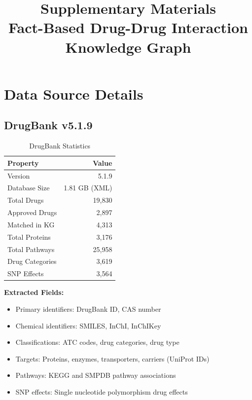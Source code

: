 \documentclass[11pt,a4paper]{article}
\title{\textbf{Supplementary Materials}\\
\large Fact-Based Drug-Drug Interaction Knowledge Graph}
\author{}
\date{}
\begin{document}
\maketitle

\tableofcontents
\newpage

\section{Data Source Details}

\subsection{DrugBank v5.1.9}
\label{sec:drugbank}

\begin{table}[h]
\centering
\caption{DrugBank Statistics}
\begin{tabular}{@{}lr@{}}
\toprule
\textbf{Property} & \textbf{Value} \\
\midrule
Version & 5.1.9 \\
Database Size & 1.81 GB (XML) \\
Total Drugs & 19,830 \\
Approved Drugs & 2,897 \\
Matched in KG & 4,313 \\
Total Proteins & 3,176 \\
Total Pathways & 25,958 \\
Drug Categories & 3,619 \\
SNP Effects & 3,564 \\
\bottomrule
\end{tabular}
\end{table}

\textbf{Extracted Fields:}
\begin{itemize}
    \item Primary identifiers: DrugBank ID, CAS number
    \item Chemical identifiers: SMILES, InChI, InChIKey
    \item Classifications: ATC codes, drug categories, drug type
    \item Targets: Proteins, enzymes, transporters, carriers (UniProt IDs)
    \item Pathways: KEGG and SMPDB pathway associations
    \item SNP effects: Single nucleotide polymorphism drug effects
\end{itemize}
\end{document}
